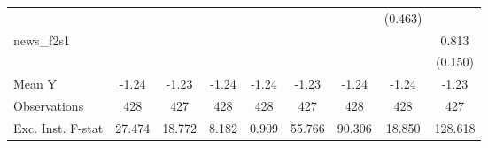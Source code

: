 {\begin{tabular}{l*{8}{c}}
            &                     &                     &                     &                     &                     &                     &     (0.463)         &                     \\
\addlinespace
news\_f2s1   &                     &                     &                     &                     &                     &                     &                     &       0.813\sym{***}\\
            &                     &                     &                     &                     &                     &                     &                     &     (0.150)         \\
\midrule
Mean Y      &       -1.24         &       -1.23         &       -1.24         &       -1.24         &       -1.23         &       -1.24         &       -1.24         &       -1.23         \\
Observations&         428         &         427         &         428         &         428         &         427         &         428         &         428         &         427         \\
Exc. Inst. F-stat&      27.474         &      18.772         &       8.182         &       0.909         &      55.766         &      90.306         &      18.850         &     128.618         \\
\bottomrule
\end{tabular}
}
